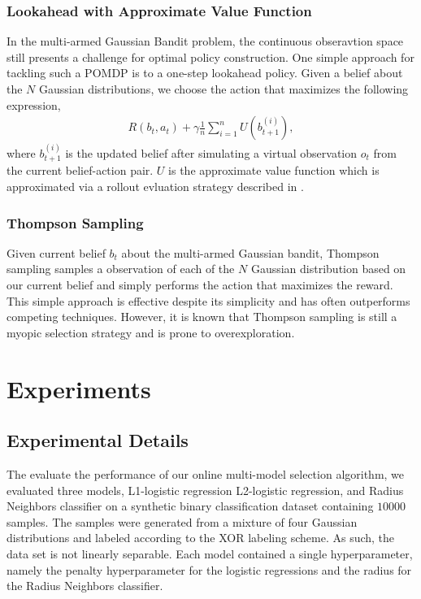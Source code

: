 \documentclass{article}
\begin{document}
\subsubsection{Lookahead with Approximate Value Function}
In the multi-armed Gaussian Bandit problem, the continuous obseravtion space still presents a challenge for optimal policy construction. One simple approach for tackling such a POMDP is to a one-step lookahead policy. Given a belief about the $N$ Gaussian distributions, we choose the action that maximizes the following expression,
\begin{align}
  R(b_t, a_t) + \gamma \frac{1}{n} \sum_{i=1}^n U(b_{t+1}^{(i)}),
\end{align}
where $b_{t+1}^{(i)}$ is the updated belief after simulating a virtual observation $o_t$ from the current belief-action pair. $U$ is the approximate value function which is approximated via a rollout evluation strategy described in \cite{someone}. 

\subsubsection{Thompson Sampling}
Given current belief $b_t$ about the multi-armed Gaussian bandit, Thompson sampling samples a observation of each of the $N$ Gaussian distribution based on our current belief and simply performs the action that maximizes the reward. This simple approach is effective despite its simplicity and has often outperforms competing techniques. However, it is known that Thompson sampling is still a myopic selection strategy and is prone to overexploration.

\section{Experiments}
\subsection{Experimental Details}
\label{exp}
The evaluate the performance of our online multi-model selection algorithm, we evaluated three models, L1-logistic regression L2-logistic regression, and Radius Neighbors classifier on a synthetic binary classification dataset containing $10000$ samples. The samples were generated from a mixture of four Gaussian distributions and labeled according to the XOR labeling scheme. As such, the data set is not linearly separable. Each model contained a single hyperparameter, namely the penalty hyperparameter for the logistic regressions and the radius for the Radius Neighbors classifier.
\end{document}
